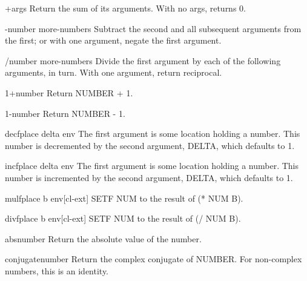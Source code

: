 \documentclass[10pt,english]{book}
\begin{document}
\begin{function}{+}{\rest args}
  Return the sum of its arguments. With no args, returns 0.
\end{function}

\begin{function}{-}{number \rest more-numbers}
  Subtract the second and all subsequent arguments from the first;
  or with one argument, negate the first argument.
\end{function}

\begin{function}{/}{number \rest more-numbers}
  Divide the first argument by each of the following arguments, in turn.
  With one argument, return reciprocal.
\end{function}

\begin{function}{1+}{number}
  Return NUMBER + 1.
\end{function}

\begin{function}{1-}{number}
  Return NUMBER - 1.
\end{function}

\begin{macro}{decf}{place \op delta \env env}
  The first argument is some location holding a number. This number is
  decremented by the second argument, DELTA, which defaults to 1.
\end{macro}

\begin{macro}{incf}{place \op delta \env env}
  The first argument is some location holding a number. This number is
  incremented by the second argument, DELTA, which defaults to 1.
\end{macro}

\begin{macro}{mulf}{place b \env env}[cl-ext]
  SETF NUM to the result of (* NUM B).
\end{macro}

\begin{macro}{divf}{place b \env env}[cl-ext]
  SETF NUM to the result of (/ NUM B).
\end{macro}

\begin{function}{abs}{number}
  Return the absolute value of the number.
\end{function}

\begin{function}{conjugate}{number}
  Return the complex conjugate of NUMBER. For non-complex numbers, this is
  an identity.
\end{function}
\end{document}
